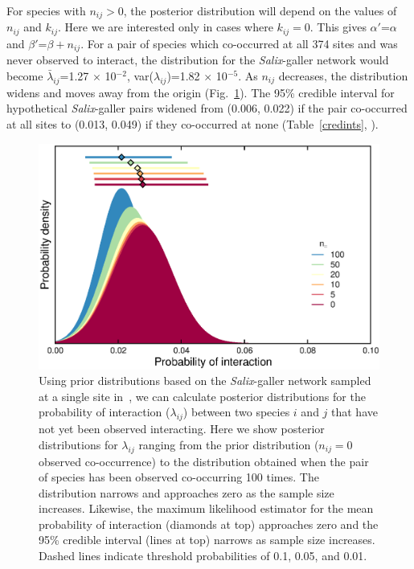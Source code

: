 \documentclass[12pt]{article}
\begin{document}
      For species with $n_{ij}>0$, the posterior distribution will depend on the values of $n_{ij}$ and $k_{ij}$. Here we are interested only in cases where $k_{ij}=0$. This gives $\alpha'$=$\alpha$ and $\beta'$=$\beta + n_{ij}$. For a pair of species which co-occurred at all 374 sites and was never observed to interact, the distribution for the \emph{Salix}-galler network would become $\bar\lambda_{ij}$=1.27 $\times$ 10$^{-2}$, var($\lambda_{ij}$)=1.82 $\times$ 10$^{-5}$. As $n_{ij}$ decreases, the distribution widens and moves away from the origin (Fig.~\ref{Salix_pdfs}). The 95\% credible interval for hypothetical \emph{Salix}-galler pairs widened from (0.006, 0.022) if the pair co-occurred at all sites to (0.013, 0.049) if they co-occurred at none (Table~\ref{credints}, ). 

      \begin{figure}[h!]
        \caption{Using prior distributions based on the \emph{Salix}-galler network sampled at a single site in~\citet{Kopelke2017}, we can calculate posterior distributions for the probability of interaction ($\lambda_{ij}$) between two species $i$ and $j$ that have not yet been observed interacting. Here we show posterior distributions for $\lambda_{ij}$ ranging from the prior distribution ($n_{ij}=0$ observed co-occurrence) to the distribution obtained when the pair of species has been observed co-occurring 100 times. The distribution narrows and approaches zero as the sample size increases. Likewise, the maximum likelihood estimator for the mean probability of interaction (diamonds at top) approaches zero and the 95\% credible interval (lines at top) narrows as sample size increases. Dashed lines indicate threshold probabilities of 0.1, 0.05, and 0.01.}
        \label{Salix_pdfs}
        \begin{center}
        \includegraphics*[width=.9\textwidth]{figures/SG_pdfs_increasing_N_Zillis.eps}
        \end{center}
        \end{figure}
\end{document}
